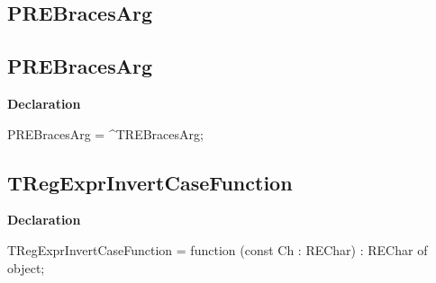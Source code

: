 \documentclass{report}
\newif\ifpdf
\begin{document}
\subsection*{\large{\textbf{PREBracesArg}}\normalsize\hspace{1ex}\hrulefill}
\else
\subsection*{PREBracesArg}
\fi
\label{RegExpr-PREBracesArg}
\begin{list}{}{
\setlength{\itemindent}{0cm}
\setlength{\listparindent}{0cm}
\setlength{\leftmargin}{\evensidemargin}
\addtolength{\leftmargin}{\tmplength}
\settowidth{\labelsep}{X}
\addtolength{\leftmargin}{\labelsep}
\setlength{\labelwidth}{\tmplength}
}
\item[\textbf{Declaration}\hfill]
\ifpdf
\begin{flushleft}
\fi
\begin{ttfamily}
PREBracesArg = {\^{}}TREBracesArg;\end{ttfamily}

\ifpdf
\end{flushleft}
\fi

\end{list}
\ifpdf
\subsection*{\large{\textbf{TRegExprInvertCaseFunction}}\normalsize\hspace{1ex}\hrulefill}
\else
\subsection*{TRegExprInvertCaseFunction}
\fi
\label{RegExpr-TRegExprInvertCaseFunction}
\begin{list}{}{
\setlength{\itemindent}{0cm}
\setlength{\listparindent}{0cm}
\setlength{\leftmargin}{\evensidemargin}
\addtolength{\leftmargin}{\tmplength}
\settowidth{\labelsep}{X}
\addtolength{\leftmargin}{\labelsep}
\setlength{\labelwidth}{\tmplength}
}
\item[\textbf{Declaration}\hfill]
\ifpdf
\begin{flushleft}
\fi
\begin{ttfamily}
TRegExprInvertCaseFunction = function (const Ch : REChar) : REChar of object;\end{ttfamily}

\ifpdf
\end{flushleft}
\fi

\end{list}
\ifpdf
\end{document}
